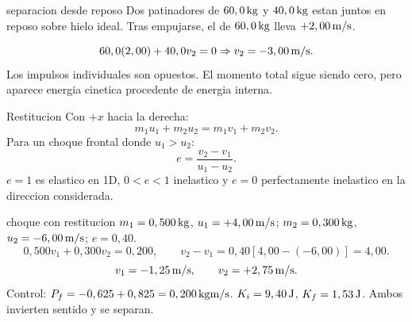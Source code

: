 \documentclass[10pt,a4paper]{article}
\begin{document}
\begin{examplebox}{separacion desde reposo}
Dos patinadores de $60,0\,\mathrm{kg}$ y $40,0\,\mathrm{kg}$ estan juntos en reposo sobre hielo ideal. Tras empujarse, el de $60,0\,\mathrm{kg}$ lleva $+2,00\,\mathrm{m/s}$.
\begin{center}
\end{center}
\solutionblock
\[
60,0(2,00)+40,0v_2=0\Rightarrow v_2=-3,00\,\mathrm{m/s}.
\]
Los impulsos individuales son opuestos. El momento total sigue siendo cero, pero aparece energia cinetica procedente de energia interna.
\end{examplebox}

\clearpage

\begin{lessoncard}{Restitucion}
Con $+x$ hacia la derecha:
\[
m_1u_1+m_2u_2=m_1v_1+m_2v_2.
\]
Para un choque frontal donde $u_1>u_2$:
\[
e=\frac{v_2-v_1}{u_1-u_2}.
\]
$e=1$ es elastico en 1D, $0<e<1$ inelastico y $e=0$ perfectamente inelastico en la direccion considerada.
\end{lessoncard}

\begin{examplebox}{choque con restitucion}
$m_1=0,500\,\mathrm{kg}$, $u_1=+4,00\,\mathrm{m/s}$; $m_2=0,300\,\mathrm{kg}$, $u_2=-6,00\,\mathrm{m/s}$; $e=0,40$.
\solutionblock
\[
0,500v_1+0,300v_2=0,200,\qquad v_2-v_1=0,40[4,00-(-6,00)]=4,00.
\]
\[
v_1=-1,25\,\mathrm{m/s},\qquad v_2=+2,75\,\mathrm{m/s}.
\]
Control: $P_f=-0,625+0,825=0,200\,\mathrm{kg}\mathrm{m/s}$. $K_i=9,40\,\mathrm{J}$, $K_f=1,53\,\mathrm{J}$. Ambos invierten sentido y se separan.
\end{examplebox}
\end{document}
